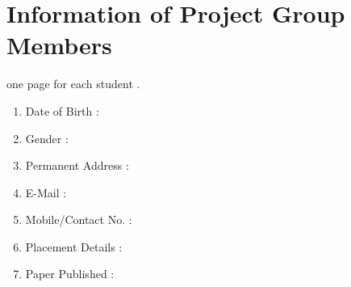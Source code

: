\documentclass[oneside,a4paper,12pt]{report}
\begin{document}
\begin{normalsize}
\begin{appendices}
\begin{enumerate}
\end{enumerate}
\chapter{Information of Project Group Members}
one page for each student .
\newpage
\begin{enumerate}
\item Date of Birth :
\item Gender : 
\item Permanent Address :
\item E-Mail : 
\item Mobile/Contact No. :
\item Placement Details :
\item Paper Published : 

\end{enumerate}
\end{appendices}
\end{normalsize}
\end{document}
